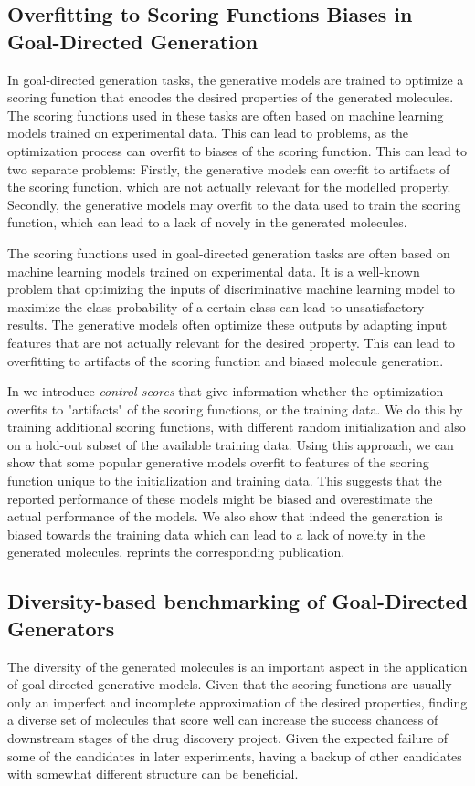 \subsection{Overfitting to Scoring Functions Biases in Goal-Directed Generation}
In goal-directed generation tasks, the generative models are trained to optimize
a scoring function that encodes the desired properties of the generated
molecules. The scoring functions used in these tasks are often based on machine
learning models trained on experimental data. This can lead to problems, as the 
optimization process can overfit to biases of the scoring function. This can
lead to two separate problems: Firstly, the generative models can overfit to
artifacts of the scoring function, which are not actually relevant for the
modelled property. Secondly, the generative models may overfit to the data 
used to train the scoring function, which can lead to a lack of novely in the
generated molecules.

The scoring functions used in goal-directed generation tasks are often based on
machine learning models trained on experimental data. It is a well-known problem
that optimizing the inputs of discriminative machine learning model 
to maximize the class-probability of a certain class can lead to unsatisfactory results.
The generative models often optimize these outputs by adapting input features that 
are not actually relevant for the desired property. This can lead to overfitting to
artifacts of the scoring function and biased molecule generation.

In \citep{renzFailureModesMolecule2019} we introduce \emph{control scores} that
give information whether the optimization overfits to "artifacts" of the scoring
functions, or the training data. We do this by training additional scoring
functions, with different random initialization and also on a hold-out subset of
the available training data. Using this approach, we can show that some popular
generative models overfit to features of the scoring function unique to the
initialization and training data. This suggests that the reported performance of
these models might be biased and overestimate the actual performance of the
models. We also show that indeed the generation is biased towards the training
data which can lead to a lack of novelty in the generated molecules.
 reprints the corresponding publication.

\subsection{Diversity-based benchmarking of Goal-Directed Generators\label{sec:divopt}}
The diversity of the generated molecules is an important aspect in the
application of goal-directed generative models. Given that the scoring functions
are usually only an imperfect and incomplete approximation of the desired
properties, finding a diverse set of molecules that score well can increase the
success chancess of downstream stages of the drug discovery project. Given the
expected failure of some of the candidates in later experiments, having a backup
of other candidates with somewhat different structure can be beneficial.

